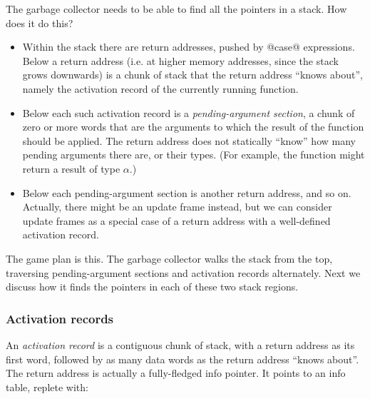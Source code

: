 \documentclass[11pt]{article}
\newcommand{\Subsubsection}[2]{\subsubsection{#1}\label{sec:#2}}
\begin{document}
The garbage collector needs to be able to find all the
pointers in a stack.  How does it do this?

\begin{itemize}

\item Within the stack there are return addresses, pushed
by @case@ expressions.  Below a return address (i.e. at higher
memory addresses, since the stack grows downwards) is a chunk
of stack that the return address ``knows about'', namely the
activation record of the currently running function.

\item Below each such activation record is a \emph{pending-argument
section}, a chunk of
zero or more words that are the arguments to which the result
of the function should be applied.  The return address does not
statically
``know'' how many pending arguments there are, or their types.
(For example, the function might return a result of type $\alpha$.)

\item Below each pending-argument section is another return address,
and so on.  Actually, there might be an update frame instead, but we
can consider update frames as a special case of a return address with
a well-defined activation record.

\end{itemize}

The game plan is this.  The garbage collector walks the stack from the
top, traversing pending-argument sections and activation records
alternately.  Next we discuss how it finds the pointers in each of
these two stack regions.


\Subsubsection{Activation records}{activation-records}

An \emph{activation record} is a contiguous chunk of stack,
with a return address as its first word, followed by as many
data words as the return address ``knows about''.  The return
address is actually a fully-fledged info pointer.  It points
to an info table, replete with:
\end{document}
